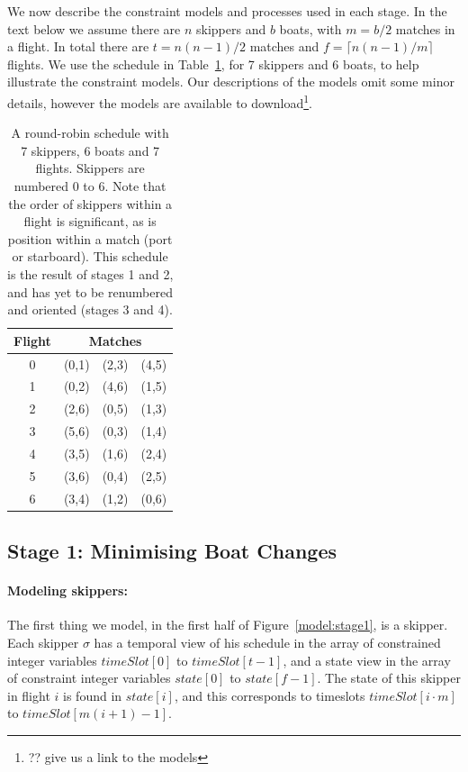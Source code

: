 \documentclass{llncs}
\newcommand{\timeSlot}{\mathit{timeSlot}}
\newcommand{\state}{\mathit{state}}
\begin{document}
We now describe the constraint models and processes used in each stage. In the
text below we assume there are $n$ skippers and $b$ boats, with $m = b/2$
matches in a flight. In total there are $t = n(n-1)/2$ matches and $f = \lceil
n(n-1)/m  \rceil$ flights. We use the schedule in Table~\ref{tab1}, for 7
skippers and 6 boats, to help illustrate the constraint models. Our
descriptions of the models omit some minor details, however the models are
available to download\footnote{?? give us a link to the models}.

\begin{table}
    \setlength{\tabcolsep}{3pt}
    \begin{tabular}{cccc}
        \toprule
        Flight & \multicolumn{3}{c}{Matches} \\ \midrule
        0 & (0,1) & (2,3) & (4,5) \\
        1 & (0,2) & (4,6) & (1,5) \\
        2 & (2,6) & (0,5) & (1,3) \\
        3 & (5,6) & (0,3) & (1,4) \\
        4 & (3,5) & (1,6) & (2,4) \\
        5 & (3,6) & (0,4) & (2,5) \\
        6 & (3,4) & (1,2) & (0,6) \\ \bottomrule
    \end{tabular}
    \caption{A round-robin schedule with 7 skippers, 6 boats and 7 flights.
        Skippers are numbered 0 to 6. Note that the order of skippers within a flight
        is significant, as is position within a match (port or starboard). This
        schedule is the result of stages 1 and 2, and has yet to be renumbered and
        oriented (stages 3 and 4).} \label{tab1}
\end{table}

\subsection{Stage 1: Minimising Boat Changes}

\paragraph{Modeling skippers:} The first thing we model, in the first half of
Figure~\ref{model:stage1}, is a skipper. Each skipper $\sigma$ has a temporal
view of his schedule in the array of constrained integer variables
$\timeSlot[0]$ to $\timeSlot[{t-1}]$, and a state view in the array of
constraint integer variables $\state[0]$ to $\state[{f-1}]$. The state of this
skipper in flight $i$ is found in $\state[i]$, and this corresponds to
timeslots $\timeSlot[{i \cdot m}]$ to $\timeSlot[{m(i+1)-1}]$.
\end{document}
